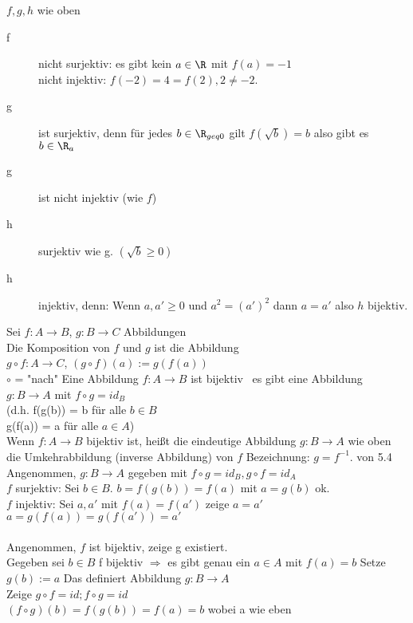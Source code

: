 %
\bsp
$f,g,h$ wie oben\\
\begin{description}
\item[f]{nicht surjektiv: es gibt kein $a\in\R$ mit $f(a)=-1$\\
nicht injektiv: $f(-2)=4=f(2), 2\neq -2.$}
%
\item[g]{ist surjektiv}, denn für jedes $b \in \R_{geq 0}$ gilt $f( \sqrt{b} ) = b$ also gibt es $b \in \R_a$
\item[g]{ist nicht injektiv (wie $f$)}
%
\item[h] {surjektiv wie g. $(\sqrt{b} \geq 0)$}
\item[h] {injektiv, denn: Wenn $a, a' \geq 0$ und $a^2 = (a')^2$ dann $a = a'$ also $h$ bijektiv.}
\end{description}
Sei $f:A→B$, $g:B→C$ Abbildungen\\
Die Komposition von $f$ und $g$ ist die Abbildung\\
$g \circ  f: A→C$, $(g \circ f)(a):=g(f(a))$\\
$\circ$ = "nach"
%
%
Eine Abbildung $f: A \to B$ ist bijektiv \equ \ es gibt eine Abbildung $g: B \to A$ mit $f \circ g = id_B$\\
(d.h. f(g(b)) = b für alle $b \in B$\\
      g(f(a)) = a für alle $a \in A$)\\
%
Wenn $f:A→B$ bijektiv ist, heißt die eindeutige Abbildung $g:B→A$ wie oben die Umkehrabbildung (inverse Abbildung) von $f$
Bezeichnung: $g=f^{-1}$.
%
\bew von 5.4  %
Angenommen, $g: B \to A$ gegeben mit $f \circ g = id_B, g \circ f = id_A$\\
$f$ surjektiv: Sei $b \in B$. $b = f(g(b)) = f(a)$ mit $a = g(b)$ ok.\\
$f$ injektiv: Sei $a, a'$ mit $f(a) = f(a')$ zeige $a = a'$ \\
$a = g(f(a)) = g(f(a')) = a' $\ok \\ \\
%
Angenommen, $f$ ist bijektiv, zeige g existiert.\\
Gegeben sei $b \in B$ f bijektiv $\Rightarrow $ es gibt genau ein $a \in A $ mit $f(a) = b$ 
Setze $g(b):=a$ Das definiert Abbildung $g:B→A$\\
Zeige $g \circ f=id; f \circ g= id$\\
$(f\circ g)(b)=f(g(b))=f(a)=b$ wobei a wie eben\\ \\
